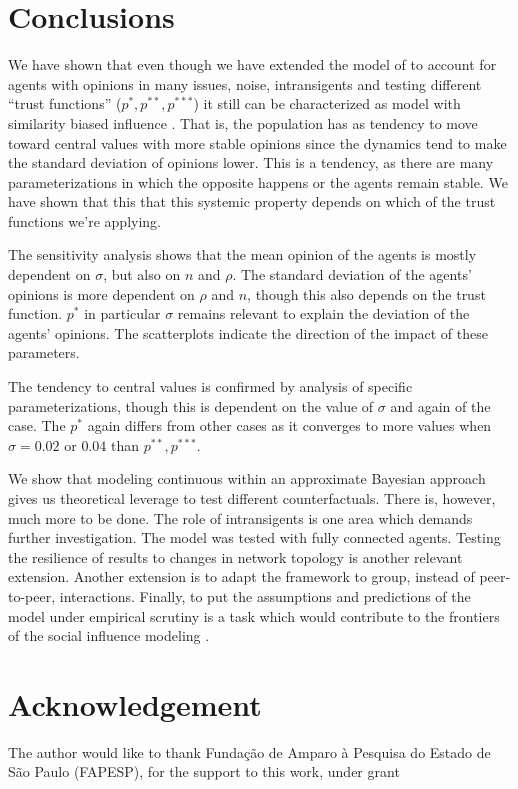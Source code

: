 \documentclass{article}
\begin{document}
  \section{Conclusions}

  We have shown that even though we have extended the model of \cite{martins08c}
  to account for agents with opinions in many issues, noise, intransigents and
  testing different ``trust functions'' (\(p^*, p^{**}, p^{***}\)) it still can
  be characterized as model with similarity biased influence \cite{flache2017}.
  That is, the population has as tendency to move toward central values with
  more stable opinions since the dynamics tend to make the standard deviation of
  opinions lower. This is a tendency, as there are many parameterizations in
  which the opposite happens or the agents remain stable. We have shown that
  this that this systemic property depends on which of the trust functions we're
  applying.

  The sensitivity analysis shows that the mean opinion of the agents is mostly
  dependent on \(\sigma\), but also on \(n\) and \(\rho\). The standard
  deviation of the agents' opinions is more dependent on \(\rho\) and \(n\),
  though this also depends on the trust function. \(p^*\) in particular
  \(\sigma\) remains relevant to explain the deviation of the agents' opinions.
  The scatterplots indicate the direction of the impact of these parameters.

  The tendency to central values is confirmed by analysis of specific
  parameterizations, though this is dependent on the value of \(\sigma\) and
  again of the case. The \(p^*\) again differs from other cases as it converges
  to more values when \(\sigma = 0.02\) or \(0.04\) than \(p^{**}, p^{***}\).

  We show that modeling continuous within an approximate Bayesian approach
  \cite{martins08a, martins08c} gives us theoretical leverage to test different
  counterfactuals. There is, however, much more to be done. The role of
  intransigents is one area which demands further investigation. The model was
  tested with fully connected agents. Testing the resilience of results to
  changes in network topology is another relevant extension. Another extension
  is to adapt the framework to group, instead of peer-to-peer, interactions.
  Finally, to put the assumptions and predictions of the model under empirical
  scrutiny is a task which would contribute to the frontiers of the social
  influence modeling \cite{flache2017}.
  
    
  




\section{Acknowledgement}
The author would like to thank Funda\c{c}\~ao de Amparo \`a Pesquisa do Estado de S\~ao Paulo (FAPESP), for the support to this work, under grant %



\end{document}
